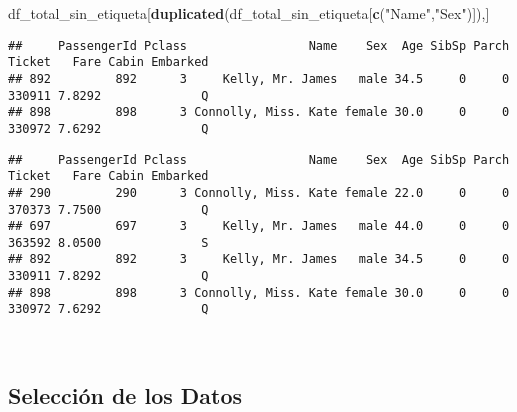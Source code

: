 \documentclass[
]{article}
\newenvironment{Shaded}{\begin{snugshade}}{\end{snugshade}}
\newcommand{\KeywordTok}[1]{\textcolor[rgb]{0.13,0.29,0.53}{\textbf{#1}}}
\newcommand{\NormalTok}[1]{#1}
\newcommand{\OperatorTok}[1]{\textcolor[rgb]{0.81,0.36,0.00}{\textbf{#1}}}
\newcommand{\StringTok}[1]{\textcolor[rgb]{0.31,0.60,0.02}{#1}}
\begin{document}
\begin{Shaded}
\begin{Highlighting}[]
\NormalTok{df_total_sin_etiqueta[}\KeywordTok{duplicated}\NormalTok{(df_total_sin_etiqueta[}\KeywordTok{c}\NormalTok{(}\StringTok{"Name"}\NormalTok{,}\StringTok{"Sex"}\NormalTok{)]),]}
\end{Highlighting}
\end{Shaded}

\begin{verbatim}
##     PassengerId Pclass                 Name    Sex  Age SibSp Parch Ticket   Fare Cabin Embarked
## 892         892      3     Kelly, Mr. James   male 34.5     0     0 330911 7.8292              Q
## 898         898      3 Connolly, Miss. Kate female 30.0     0     0 330972 7.6292              Q
\end{verbatim}

\begin{Shaded}
\end{Shaded}

\begin{verbatim}
##     PassengerId Pclass                 Name    Sex  Age SibSp Parch Ticket   Fare Cabin Embarked
## 290         290      3 Connolly, Miss. Kate female 22.0     0     0 370373 7.7500              Q
## 697         697      3     Kelly, Mr. James   male 44.0     0     0 363592 8.0500              S
## 892         892      3     Kelly, Mr. James   male 34.5     0     0 330911 7.8292              Q
## 898         898      3 Connolly, Miss. Kate female 30.0     0     0 330972 7.6292              Q
\end{verbatim}

\texttt{}~\\
\texttt{}

\hypertarget{selecciuxf3n-de-los-datos}{%
\subsection{\texorpdfstring{\textbf{Selección de los
Datos}}{Selección de los Datos}}\label{selecciuxf3n-de-los-datos}}
\end{document}
